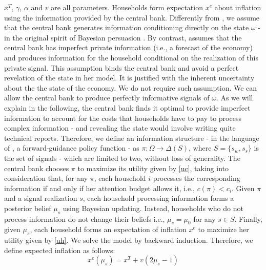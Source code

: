 \documentclass[12pt,a4paper]{article}
\begin{document}
$x^T$, $\gamma$, $\alpha$ and $v$ are all parameters. Households form expectation $x^e$ about inflation using the information provided by the central bank. Differently from \cite{Ko2022}, we assume that the central bank generates information conditioning directly on the state $\omega$ - in the original spirit of Bayesian persuasion \citep{KG2011}. By contrast, \cite{Ko2022} assumes that the central bank has imperfect private information (i.e., a forecast of the economy) and produces information for the household conditional on the realization of this private signal. This assumption binds the central bank and avoid a perfect revelation of the state in her model. It is justified with the inherent uncertainty about the the state of the economy. We do not require such assumption. We can allow the central bank to produce perfectly informative signals of $\omega$. As we will explain in the following, the central bank finds it optimal to provide imperfect information to account for the costs that households have to pay to process complex information - and revealing the state would involve writing quite technical reports. Therefore, we define an information structure - in the language of \cite{Ko2022}, a forward-guidance policy function - as $\pi \colon \Omega \to \Delta(S)$, where $S=\{s_w,s_s\}$ is the set of signals - which are limited to two, without loss of generality. The central bank chooses $\pi$ to maximize its utility given by \eqref{uc}, taking into consideration that, for any $\pi$, each household $i$ processes the corresponding information if and only if her attention budget allows it, i.e., $c(\pi)< c_i$. Given $\pi$ and a signal realization $s$, each household processing information forms a posterior belief $\mu_s$ using Bayesian updating.
Instead, households who do not process information do not change their beliefs i.e., $\mu_s=\mu_0$ for any $s\in S$. Finally, given $\mu_s$, each household forms an expectation of inflation $x^e$ to maximize her utility given by \eqref{uh}. We solve the model by backward induction. Therefore, we define expected inflation as follows:
\begin{equation}
    x^e(\mu_s)=x^T+v(2\mu_s-1)
\end{equation}
\end{document}
